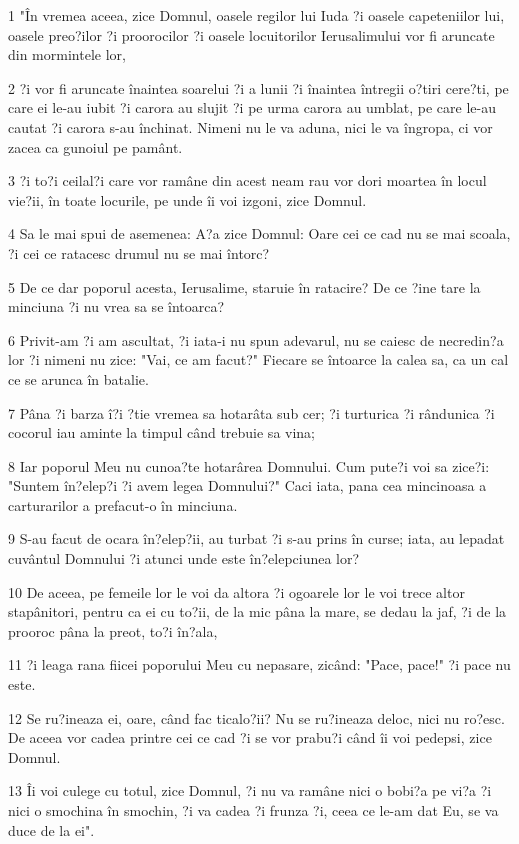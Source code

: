\par 1 "În vremea aceea, zice Domnul, oasele regilor lui Iuda ?i oasele capeteniilor lui, oasele preo?ilor ?i proorocilor ?i oasele locuitorilor Ierusalimului vor fi aruncate din mormintele lor,
\par 2 ?i vor fi aruncate înaintea soarelui ?i a lunii ?i înaintea întregii o?tiri cere?ti, pe care ei le-au iubit ?i carora au slujit ?i pe urma carora au umblat, pe care le-au cautat ?i carora s-au închinat. Nimeni nu le va aduna, nici le va îngropa, ci vor zacea ca gunoiul pe pamânt.
\par 3 ?i to?i ceilal?i care vor ramâne din acest neam rau vor dori moartea în locul vie?ii, în toate locurile, pe unde îi voi izgoni, zice Domnul.
\par 4 Sa le mai spui de asemenea: A?a zice Domnul: Oare cei ce cad nu se mai scoala, ?i cei ce ratacesc drumul nu se mai întorc?
\par 5 De ce dar poporul acesta, Ierusalime, staruie în ratacire? De ce ?ine tare la minciuna ?i nu vrea sa se întoarca?
\par 6 Privit-am ?i am ascultat, ?i iata-i nu spun adevarul, nu se caiesc de necredin?a lor ?i nimeni nu zice: "Vai, ce am facut?" Fiecare se întoarce la calea sa, ca un cal ce se arunca în batalie.
\par 7 Pâna ?i barza î?i ?tie vremea sa hotarâta sub cer; ?i turturica ?i rândunica ?i cocorul iau aminte la timpul când trebuie sa vina;
\par 8 Iar poporul Meu nu cunoa?te hotarârea Domnului. Cum pute?i voi sa zice?i: "Suntem în?elep?i ?i avem legea Domnului?" Caci iata, pana cea mincinoasa a carturarilor a prefacut-o în minciuna.
\par 9 S-au facut de ocara în?elep?ii, au turbat ?i s-au prins în curse; iata, au lepadat cuvântul Domnului ?i atunci unde este în?elepciunea lor?
\par 10 De aceea, pe femeile lor le voi da altora ?i ogoarele lor le voi trece altor stapânitori, pentru ca ei cu to?ii, de la mic pâna la mare, se dedau la jaf, ?i de la prooroc pâna la preot, to?i în?ala,
\par 11 ?i leaga rana fiicei poporului Meu cu nepasare, zicând: "Pace, pace!" ?i pace nu este.
\par 12 Se ru?ineaza ei, oare, când fac ticalo?ii? Nu se ru?ineaza deloc, nici nu ro?esc. De aceea vor cadea printre cei ce cad ?i se vor prabu?i când îi voi pedepsi, zice Domnul.
\par 13 Îi voi culege cu totul, zice Domnul, ?i nu va ramâne nici o bobi?a pe vi?a ?i nici o smochina în smochin, ?i va cadea ?i frunza ?i, ceea ce le-am dat Eu, se va duce de la ei".
